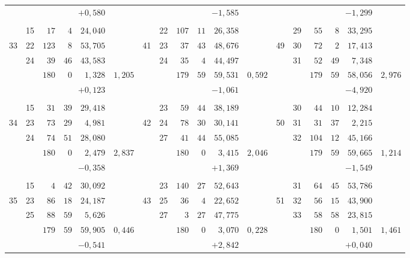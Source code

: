 \begin{center}
\begin{tabular}{|r|r|r@{\;}r@{\;}r|r||r|r|r@{\;}r@{\;}r|r||r|r|r@{\;}r@{\;}r|r|}
 &  & \multicolumn{3}{r|}{$+0{,}580$} &  &  &  & \multicolumn{3}{r|}{$-1{,}585$} &  &  &  & \multicolumn{3}{r|}{$-1{,}299$} & \\
 &  &  &  &  &  &  &  &  &  &  &  &  &  &  &  &  & \\
 & 15 & $17$ & $4$ & $24{,}040$ &  &  & 22 & $107$ & $11$ & $26{,}358$ &  &  & 29 & $55$ & $8$ & $33{,}295$ & \\
33 & 22 & $123$ & $8$ & $53{,}705$ &  & 41 & 23 & $37$ & $43$ & $48{,}676$ &  & 49 & 30 & $72$ & $2$ & $17{,}413$ & \\
 & 24 & $39$ & $46$ & $43{,}583$ &  &  & 24 & $35$ & $4$ & $44{,}497$ &  &  & 31 & $52$ & $49$ & $7{,}348$ & \\
\cline{3-5}\cline{9-11}\cline{15-17}
 &  & $180$ & $0$ & $1{,}328$ & $1{,}205$ &  &  & $179$ & $59$ & $59{,}531$ & $0{,}592$ &  &  & $179$ & $59$ & $58{,}056$ & $2{,}976$\\
 &  & \multicolumn{3}{r|}{$+0{,}123$} &  &  &  & \multicolumn{3}{r|}{$-1{,}061$} &  &  &  & \multicolumn{3}{r|}{$-4{,}920$} & \\
 &  &  &  &  &  &  &  &  &  &  &  &  &  &  &  &  & \\
 & 15 & $31$ & $39$ & $29{,}418$ &  &  & 23 & $59$ & $44$ & $38{,}189$ &  &  & 30 & $44$ & $10$ & $12{,}284$ & \\
34 & 23 & $73$ & $29$ & $4{,}981$ &  & 42 & 24 & $78$ & $30$ & $30{,}141$ &  & 50 & 31 & $31$ & $37$ & $2{,}215$ & \\
 & 24 & $74$ & $51$ & $28{,}080$ &  &  & 27 & $41$ & $44$ & $55{,}085$ &  &  & 32 & $104$ & $12$ & $45{,}166$ & \\
\cline{3-5}\cline{9-11}\cline{15-17}
 &  & $180$ & $0$ & $2{,}479$ & $2{,}837$ &  &  & $180$ & $0$ & $3{,}415$ & $2{,}046$ &  &  & $179$ & $59$ & $59{,}665$ & $1{,}214$\\
 &  & \multicolumn{3}{r|}{$-0{,}358$} &  &  &  & \multicolumn{3}{r|}{$+1{,}369$} &  &  &  & \multicolumn{3}{r|}{$-1{,}549$} & \\
 &  &  &  &  &  &  &  &  &  &  &  &  &  &  &  &  & \\
 & 15 & $4$ & $42$ & $30{,}092$ &  &  & 23 & $140$ & $27$ & $52{,}643$ &  &  & 31 & $64$ & $45$ & $53{,}786$ & \\
35 & 23 & $86$ & $18$ & $24{,}187$ &  & 43 & 25 & $36$ & $4$ & $22{,}652$ &  & 51 & 32 & $56$ & $15$ & $43{,}900$ & \\
 & 25 & $88$ & $59$ & $5{,}626$ &  &  & 27 & $3$ & $27$ & $47{,}775$ &  &  & 33 & $58$ & $58$ & $23{,}815$ & \\
\cline{3-5}\cline{9-11}\cline{15-17}
 &  & $179$ & $59$ & $59{,}905$ & $0{,}446$ &  &  & $180$ & $0$ & $3{,}070$ & $0{,}228$ &  &  & $180$ & $0$ & $1{,}501$ & $1{,}461$\\
 &  & \multicolumn{3}{r|}{$-0{,}541$} &  &  &  & \multicolumn{3}{r|}{$+2{,}842$} &  &  &  & \multicolumn{3}{r|}{$+0{,}040$} & \\
\end{tabular}
\endgroup
\end{center}

